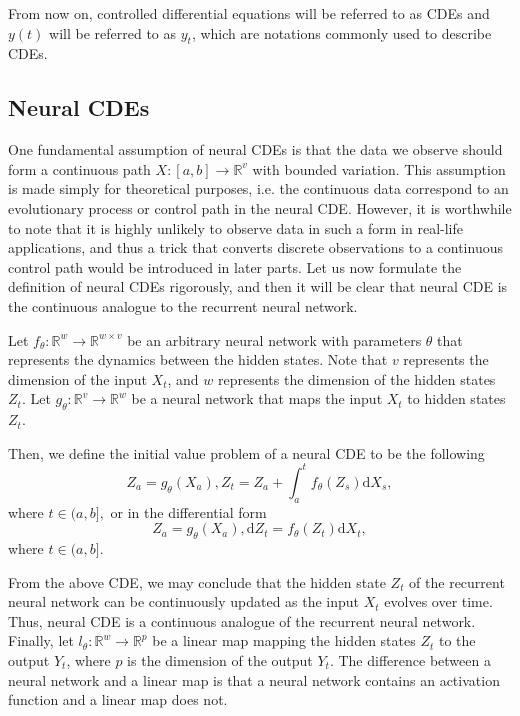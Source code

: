 \documentclass[a4paper,11pt,titlepage]{article}
\theoremstyle{definition}
\theoremstyle{plain}
\theoremstyle{remark}
\begin{document}
From now on, controlled differential equations will be referred to as CDEs and $y(t)$ will be referred to as $y_t$, which are notations commonly used to describe CDEs.

\subsection{Neural CDEs}

One fundamental assumption of neural CDEs is that the data we observe should form a continuous path $X:[a,b]\rightarrow\mathbb{R}^v$ with bounded variation. This assumption is made simply for theoretical purposes, i.e. the continuous data correspond to an evolutionary process or control path in the neural CDE. However, it is worthwhile to note that it is highly unlikely to observe data in such a form in real-life applications, and thus a trick that converts discrete observations to a continuous control path would be introduced in later parts. Let us now formulate the definition of neural CDEs rigorously, and then it will be clear that neural CDE is the continuous analogue to the recurrent neural network.

 Let $f_\theta:\mathbb{R}^w\rightarrow\mathbb{R}^{w\times v}$ be an arbitrary neural network with parameters $\theta$ that represents the dynamics between the hidden states. Note that $v$ represents the dimension of the input $X_t$, and $w$ represents the dimension of the hidden states $Z_t$. Let $g_\theta:\mathbb{R}^v\rightarrow\mathbb{R}^w$ be a neural network that maps the input $X_t$ to hidden states $Z_t$.

Then, we define the initial value problem of a neural CDE to be the following
$$Z_a=g_\theta(X_a), Z_t=Z_a+\int_a^tf_\theta(Z_s)\mathrm{d}X_s,$$ where $t\in(a,b],$
or in the differential form
$$Z_a=g_\theta(X_a), \mathrm{d}Z_t=f_\theta(Z_t)\mathrm{d}X_t,$$ where $t\in(a,b].$ \cite{kidger2022neural}

From the above CDE, we may conclude that the hidden state $Z_t$ of the recurrent neural network can be continuously updated as the input $X_t$ evolves over time. Thus, neural CDE is a continuous analogue of the recurrent neural network. Finally, let $l_\theta:\mathbb{R}^w\rightarrow\mathbb{R}^p$ be a linear map mapping the hidden states $Z_t$ to the output $Y_t$, where $p$ is the dimension of the output $Y_t$. The difference between a neural network and a linear map is that a neural network contains an activation function and a linear map does not.
\end{document}
